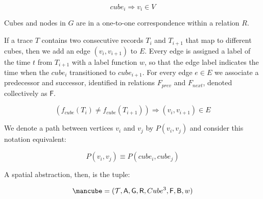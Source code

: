 \begin{equation}
  cube_i \Rightarrow v_i \in V
\end{equation}

Cubes and nodes in $G$ are in a one-to-one correspondence within a relation $R$.

If a trace $T$ contains two consecutive records $T_i$ and $T_{i+1}$ that map to different cubes, then we add an edge $(v_i, v_{i+1})$ to $E$. 
Every edge is assigned a label of the time $t$ from $T_{i+1}$ with a label function $w$, so that the edge label indicates the time when the $cube_i$ transitioned to $cube_{i+1}$.
For every edge $e\in E$ we associate a predecessor and successor, identified in relations $F_{prev}$ and $F_{next}$, denoted collectively as $\mathsf{F}$.

\begin{equation}
  \left( f_{cube}(T_i) \neq f_{cube}(T_{i+1}) \right) \Rightarrow (v_i, v_{i+1}) \in E
\end{equation}

We denote a path between vertices $v_i$ and $v_j$ by $P(v_i, v_j)$ and consider this notation equivalent:

\begin{equation}
  P(v_i, v_j) \equiv P(cube_i, cube_j)
\end{equation}

A spatial abstraction, then, is the tuple:

\begin{equation}
\cube = (\mathcal{T}, \mathsf{A}, \mathsf{G}, \mathsf{R}, Cube^3, \mathsf{F}, \mathsf{B}, w)
\end{equation}






